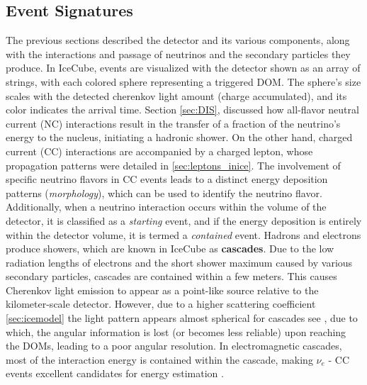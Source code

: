 \subsection{Event Signatures}
\label{sec:morphologies}
The previous sections described the detector and its various components, along with the interactions and passage of neutrinos and the secondary particles they produce. In IceCube, events are visualized with the detector shown as an array of strings, with each colored sphere representing a triggered DOM. The sphere's size scales with the detected cherenkov light amount (charge accumulated), and its color indicates the arrival time. Section \ref{sec:DIS}, discussed how all-flavor neutral current (NC) interactions result in the transfer of a fraction of the neutrino's energy to the nucleus, initiating a hadronic shower. On the other hand, charged current (CC) interactions are accompanied by a charged lepton, whose propagation patterns were detailed in \ref{sec:leptons_inice}. The involvement of specific neutrino flavors in CC events leads to a distinct energy deposition patterns (\emph{morphology}), which can be used to identify the neutrino flavor. Additionally, when a neutrino interaction occurs within the volume of the detector, it is classified as a \emph{starting} event, and if the energy deposition is entirely within the detector volume, it is termed a \emph{contained} event.
Hadrons and electrons produce showers, which are known in IceCube as \textbf{cascades}. Due to the low radiation lengths of electrons and the short shower maximum caused by various secondary particles, cascades are contained within a few meters. This causes Cherenkov light emission to appear as a point-like source relative to the kilometer-scale detector. However, due to a higher scattering coefficient \ref{sec:icemodel} the light pattern appears almost spherical for cascades see , due to which, the angular information is lost (or becomes less reliable) upon reaching the DOMs, leading to a poor angular resolution. In electromagnetic cascades, most of the interaction energy is contained within the cascade, making $\nu_{e}$ - CC events excellent candidates for energy estimation .
